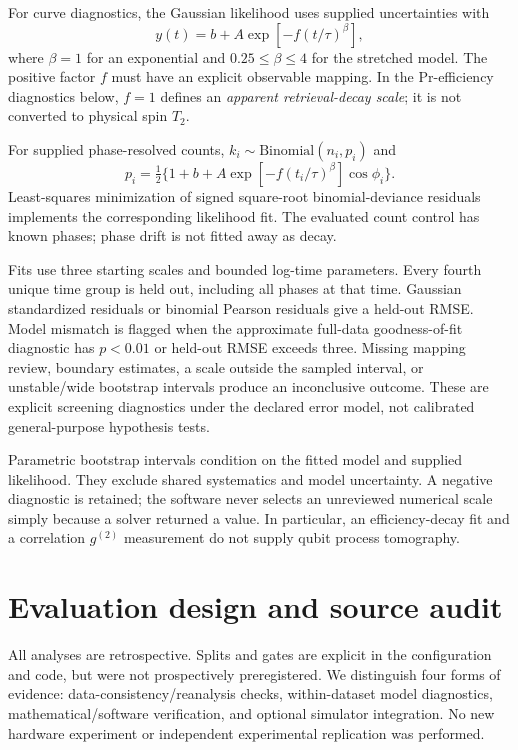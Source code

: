 \documentclass[11pt,a4paper]{article}
\begin{document}
For curve diagnostics, the Gaussian likelihood uses supplied uncertainties with
\begin{equation}
y(t)=b+A\exp[-f(t/\tau)^\beta],
\label{eq:curve}
\end{equation}
where $\beta=1$ for an exponential and $0.25\leq\beta\leq4$ for the stretched model. The positive factor $f$ must have an explicit observable mapping. In the Pr-efficiency diagnostics below, $f=1$ defines an \emph{apparent retrieval-decay scale}; it is not converted to physical spin $T_2$.

For supplied phase-resolved counts, $k_i\sim\mathrm{Binomial}(n_i,p_i)$ and
\begin{equation}
p_i=\tfrac12\{1+b+A\exp[-f(t_i/\tau)^\beta]\cos\phi_i\}.
\end{equation}
Least-squares minimization of signed square-root binomial-deviance residuals implements the corresponding likelihood fit. The evaluated count control has known phases; phase drift is not fitted away as decay.

Fits use three starting scales and bounded log-time parameters. Every fourth unique time group is held out, including all phases at that time. Gaussian standardized residuals or binomial Pearson residuals give a held-out RMSE. Model mismatch is flagged when the approximate full-data goodness-of-fit diagnostic has $p<0.01$ or held-out RMSE exceeds three. Missing mapping review, boundary estimates, a scale outside the sampled interval, or unstable/wide bootstrap intervals produce an inconclusive outcome. These are explicit screening diagnostics under the declared error model, not calibrated general-purpose hypothesis tests.

Parametric bootstrap intervals condition on the fitted model and supplied likelihood. They exclude shared systematics and model uncertainty. A negative diagnostic is retained; the software never selects an unreviewed numerical scale simply because a solver returned a value. In particular, an efficiency-decay fit and a correlation $g^{(2)}$ measurement do not supply qubit process tomography.

\section{Evaluation design and source audit}
All analyses are retrospective. Splits and gates are explicit in the configuration and code, but were not prospectively preregistered. We distinguish four forms of evidence: data-consistency/reanalysis checks, within-dataset model diagnostics, mathematical/software verification, and optional simulator integration. No new hardware experiment or independent experimental replication was performed.
\end{document}
